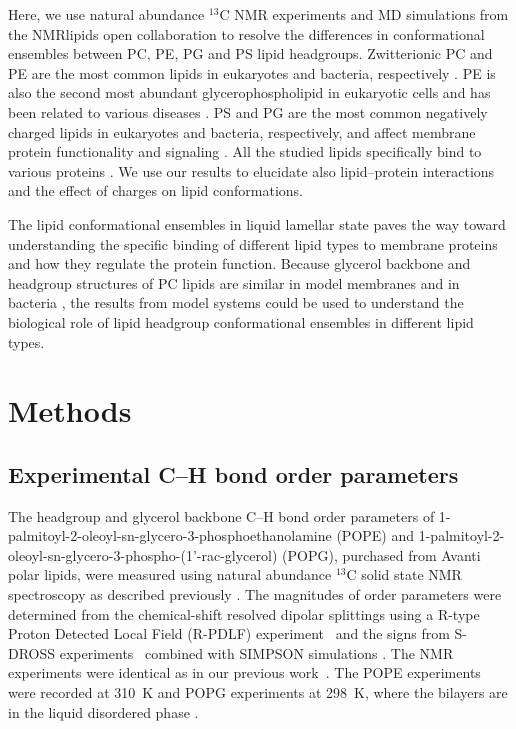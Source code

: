\documentclass[aps,prl,superscriptaddress,twocolumn]{revtex4}
\begin{document}
Here, we use natural abundance $^{13}$C NMR experiments and MD simulations from the NMRlipids open collaboration
to resolve the differences in conformational ensembles between PC, PE, PG and PS lipid headgroups.
Zwitterionic PC and PE are the most common lipids in eukaryotes and bacteria, respectively \cite{vanmeer08,sohlenkamp16}.
PE is also the second most abundant glycerophospholipid in eukaryotic cells
and has been related to various diseases \cite{vance15,calzada16,patel17}.
PS and PG are the most common negatively charged lipids in eukaryotes and bacteria, respectively,
and affect membrane protein functionality and signaling \cite{lemmon08,leventis10,sohlenkamp16,hariharan18}.
All the studied lipids specifically bind to various proteins \cite{yeagle14}. We use our results to elucidate also lipid--protein interactions and the effect of charges on lipid conformations.

The lipid conformational ensembles in liquid lamellar state paves the way toward understanding the
specific binding of different lipid types to membrane proteins and how they regulate the protein function.
Because glycerol backbone and headgroup structures of PC lipids are similar in model membranes and in bacteria \cite{gally81,scherer87,seelig90},
the results from model systems could be used to understand the biological role of lipid headgroup conformational ensembles in different lipid types.



\section{Methods}
\subsection{Experimental C--H bond order parameters}
The headgroup and glycerol backbone C--H bond order parameters of 1-palmitoyl-2-oleoyl-sn-glycero-3-phosphoethanolamine (POPE) and 1-palmitoyl-2-oleoyl-sn-glycero-3-phospho-(1'-rac-glycerol) (POPG), purchased from Avanti polar lipids, were measured using natural abundance $^{13}$C solid state NMR spectroscopy as described previously \cite{ferreira13,ferreira16}. The magnitudes of order parameters were determined from the chemical-shift resolved dipolar splittings using a R-type Proton Detected Local Field (R-PDLF) experiment~\cite{dvinskikh04} and the signs from S-DROSS experiments~\cite{gross97} combined with SIMPSON simulations \cite{bak00}.
The NMR experiments were identical as in our previous work~\cite{antila19}. The POPE experiments were recorded at 310~K and POPG experiments at 298~K, where the bilayers are in the liquid disordered phase \cite{marsh13}.
\end{document}
